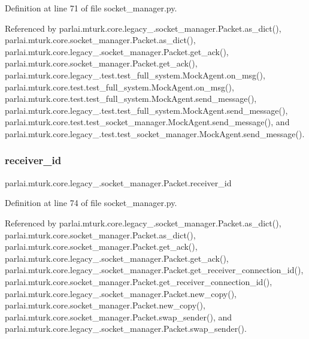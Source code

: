 Definition at line 71 of file socket\+\_\+manager.\+py.



Referenced by parlai.\+mturk.\+core.\+legacy\+\_.\+socket\+\_\+manager.\+Packet.\+as\+\_\+dict(), parlai.\+mturk.\+core.\+socket\+\_\+manager.\+Packet.\+as\+\_\+dict(), parlai.\+mturk.\+core.\+legacy\+\_.\+socket\+\_\+manager.\+Packet.\+get\+\_\+ack(), parlai.\+mturk.\+core.\+socket\+\_\+manager.\+Packet.\+get\+\_\+ack(), parlai.\+mturk.\+core.\+legacy\+\_.\+test.\+test\+\_\+full\+\_\+system.\+Mock\+Agent.\+on\+\_\+msg(), parlai.\+mturk.\+core.\+test.\+test\+\_\+full\+\_\+system.\+Mock\+Agent.\+on\+\_\+msg(), parlai.\+mturk.\+core.\+test.\+test\+\_\+full\+\_\+system.\+Mock\+Agent.\+send\+\_\+message(), parlai.\+mturk.\+core.\+legacy\+\_.\+test.\+test\+\_\+full\+\_\+system.\+Mock\+Agent.\+send\+\_\+message(), parlai.\+mturk.\+core.\+test.\+test\+\_\+socket\+\_\+manager.\+Mock\+Agent.\+send\+\_\+message(), and parlai.\+mturk.\+core.\+legacy\+\_.\+test.\+test\+\_\+socket\+\_\+manager.\+Mock\+Agent.\+send\+\_\+message().

\mbox{\label{classparlai_1_1mturk_1_1core_1_1legacy__2018_1_1socket__manager_1_1Packet_af58d168251594cf0de296a96e9772d51}} 
\subsubsection{\texorpdfstring{receiver\+\_\+id}{receiver\_id}}
{\footnotesize\ttfamily parlai.\+mturk.\+core.\+legacy\+\_.\+socket\+\_\+manager.\+Packet.\+receiver\+\_\+id}



Definition at line 74 of file socket\+\_\+manager.\+py.



Referenced by parlai.\+mturk.\+core.\+legacy\+\_.\+socket\+\_\+manager.\+Packet.\+as\+\_\+dict(), parlai.\+mturk.\+core.\+socket\+\_\+manager.\+Packet.\+as\+\_\+dict(), parlai.\+mturk.\+core.\+socket\+\_\+manager.\+Packet.\+get\+\_\+ack(), parlai.\+mturk.\+core.\+legacy\+\_.\+socket\+\_\+manager.\+Packet.\+get\+\_\+ack(), parlai.\+mturk.\+core.\+legacy\+\_.\+socket\+\_\+manager.\+Packet.\+get\+\_\+receiver\+\_\+connection\+\_\+id(), parlai.\+mturk.\+core.\+socket\+\_\+manager.\+Packet.\+get\+\_\+receiver\+\_\+connection\+\_\+id(), parlai.\+mturk.\+core.\+legacy\+\_.\+socket\+\_\+manager.\+Packet.\+new\+\_\+copy(), parlai.\+mturk.\+core.\+socket\+\_\+manager.\+Packet.\+new\+\_\+copy(), parlai.\+mturk.\+core.\+socket\+\_\+manager.\+Packet.\+swap\+\_\+sender(), and parlai.\+mturk.\+core.\+legacy\+\_.\+socket\+\_\+manager.\+Packet.\+swap\+\_\+sender().

